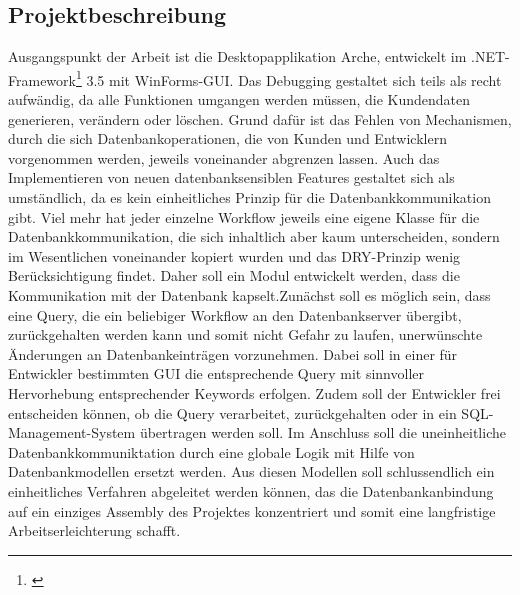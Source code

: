 \documentclass[11pt,toc=sectionentrywithoutdots, 
headheight=44pt, headings=optiontoheadandtoc, hyperfootnotes=false, hypertexnames=false]{scrartcl}
\begin{document}
\subsection{Projektbeschreibung}
Ausgangspunkt der Arbeit ist die Desktopapplikation \glqq Arche\grqq{}, entwickelt im .NET-Framework\footnote{\cite{Microsoft2020}} 3.5 mit WinForms-\acs{GUI}. Das Debugging gestaltet sich teils als recht aufwändig, da alle Funktionen umgangen werden müssen, die Kundendaten generieren, verändern oder löschen. Grund dafür ist das Fehlen von Mechanismen, durch die sich Datenbankoperationen, die von Kunden und Entwicklern vorgenommen werden, jeweils voneinander abgrenzen lassen. Auch das Implementieren von neuen datenbanksensiblen Features gestaltet sich als umständlich, da es kein einheitliches Prinzip für die Datenbankkommunikation gibt. Viel mehr hat jeder einzelne Workflow jeweils eine eigene Klasse für die Datenbankkommunikation, die sich inhaltlich aber kaum unterscheiden, sondern im Wesentlichen voneinander kopiert wurden und das \acs{DRY}-Prinzip wenig Berücksichtigung findet. Daher soll ein Modul entwickelt werden, dass die Kommunikation mit der Datenbank kapselt.\newline Zunächst soll es möglich sein, dass eine \gls{Query}, die ein beliebiger Workflow an den Datenbankserver übergibt, zurückgehalten werden kann und somit nicht Gefahr zu laufen, unerwünschte Änderungen an Datenbankeinträgen vorzunehmen. Dabei soll in einer für Entwickler bestimmten GUI die entsprechende Query mit sinnvoller Hervorhebung entsprechender Keywords erfolgen. Zudem soll der Entwickler frei entscheiden können, ob die Query verarbeitet, zurückgehalten oder in ein \acs{SQL}-Management-System übertragen werden soll. Im Anschluss soll die uneinheitliche Datenbankkommuniktation durch eine globale Logik mit Hilfe von Datenbankmodellen ersetzt werden. Aus diesen Modellen soll schlussendlich ein einheitliches Verfahren abgeleitet werden können, das die Datenbankanbindung auf ein einziges \gls{Assembly} des Projektes konzentriert und somit eine langfristige Arbeitserleichterung schafft.
\end{document}
